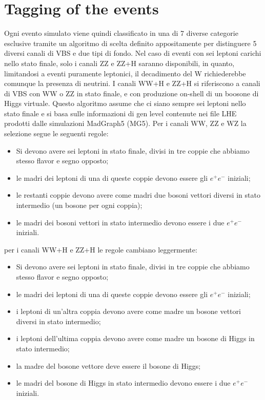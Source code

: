 \section{Tagging of the events}
\label{sec:tagging}
Ogni evento simulato viene quindi classificato in una di 7 diverse categorie esclusive tramite un algoritmo di scelta definito appositamente per distinguere 5 diversi canali di VBS e due tipi di fondo.
Nel caso di eventi con sei leptoni carichi nello stato finale, solo i canali ZZ e ZZ+H saranno disponibili, in quanto, limitandosi a eventi puramente leptonici, il decadimento del W richiederebbe comunque la presenza di neutrini.
I canali WW+H e ZZ+H si riferiscono a canali di VBS con WW o ZZ in stato finale, e con produzione on-shell di un boosone di Higgs virtuale.
Questo algoritmo assume che ci siano sempre sei leptoni nello stato finale e si basa sulle informazioni di gen level contenute nei file LHE  prodotti dalle simulazioni MadGraph5 (MG5).
Per i canali WW, ZZ e WZ la selezione segue le seguenti regole:
\begin{itemize}
    \item Si devono avere sei leptoni in stato finale, divisi in tre coppie che abbiamo stesso flavor e segno opposto;
    \item le madri dei leptoni di una di queste coppie devono essere gli $e^+e^-$ iniziali;
    \item le restanti coppie devono avere come madri due bosoni vettori diversi in stato intermedio (un bosone per ogni coppia);
    \item le madri dei bosoni vettori in stato intermedio devono essere i due $e^+e^-$ iniziali.
\end{itemize}

per i canali WW+H e ZZ+H le regole cambiano leggermente:
\begin{itemize}
    \item Si devono avere sei leptoni in stato finale, divisi in tre coppie che abbiamo stesso flavor e segno opposto;
    \item le madri dei leptoni di una di queste coppie devono essere gli $e^+e^-$ iniziali;
    \item i leptoni di un'altra coppia devono avere come madre un bosone vettori diversi in stato intermedio;
    \item i leptoni dell'ultima coppia devono avere come madre un bosone di Higgs in stato intermedio;
    \item la madre del bosone vettore deve essere il bosone di Higgs;
    \item le madri del bosone di Higgs in stato intermedio devono essere i due $e^+e^-$ iniziali.
\end{itemize}

